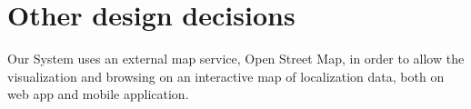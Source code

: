 \section{Other design decisions}

Our System uses an external map service, Open Street Map, in order to allow the visualization and browsing on an interactive map of localization data, both on web app and mobile application. 